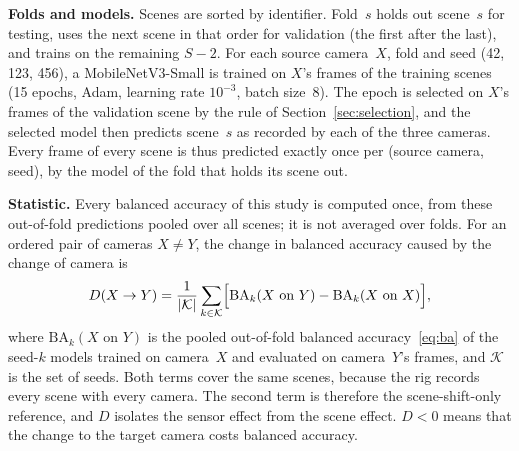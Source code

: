 \documentclass[journal]{IEEEtran}
\begin{document}
\textbf{Folds and models.} Scenes are sorted by identifier. Fold~$s$ holds out scene~$s$ for testing, uses the next scene in that order for validation (the first after the last), and trains on the remaining $S-2$. For each source camera~$X$, fold and seed (42, 123, 456), a MobileNetV3-Small is trained on $X$'s frames of the training scenes (15 epochs, Adam, learning rate $10^{-3}$, batch size~8). The epoch is selected on $X$'s frames of the validation scene by the rule of Section~\ref{sec:selection}, and the selected model then predicts scene~$s$ as recorded by each of the three cameras. Every frame of every scene is thus predicted exactly once per (source camera, seed), by the model of the fold that holds its scene out.

\textbf{Statistic.} Every balanced accuracy of this study is computed once, from these out-of-fold predictions pooled over all scenes; it is not averaged over folds. For an ordered pair of cameras $X \neq Y$, the change in balanced accuracy caused by the change of camera is
\begin{equation}
D(X \rightarrow Y) = \frac{1}{|\mathcal{K}|}\sum_{k \in \mathcal{K}} \Bigl[ \mathrm{BA}_k(X \text{ on } Y) - \mathrm{BA}_k(X \text{ on } X) \Bigr],
\label{eq:sensorgap}
\end{equation}
where $\mathrm{BA}_k(X \text{ on } Y)$ is the pooled out-of-fold balanced accuracy~\eqref{eq:ba} of the seed-$k$ models trained on camera~$X$ and evaluated on camera~$Y$'s frames, and $\mathcal{K}$ is the set of seeds. Both terms cover the same scenes, because the rig records every scene with every camera. The second term is therefore the scene-shift-only reference, and $D$ isolates the sensor effect from the scene effect. $D<0$ means that the change to the target camera costs balanced accuracy.
\end{document}
